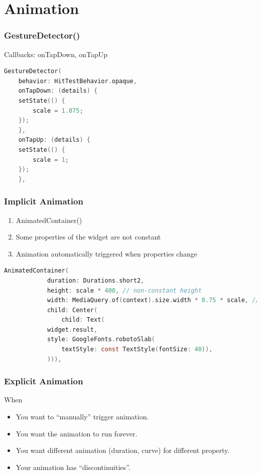 \documentclass[compress, aspectratio=32]{beamer}
\begin{document}
\section{Animation}
\begin{frame}[fragile]
    \frametitle{GestureDetector()}
    Callbacks: onTapDown, onTapUp
    \begin{lstlisting}[language=c, firstnumber=201]
GestureDetector(
    behavior: HitTestBehavior.opaque,
    onTapDown: (details) {
    setState(() {
        scale = 1.075;
    });
    },
    onTapUp: (details) {
    setState(() {
        scale = 1;
    });
    },
    \end{lstlisting}
\end{frame}
\begin{frame}[fragile]
    \frametitle{Implicit Animation}
    \begin{enumerate}
        \item AnimatedContainer()
        \item Some properties of the widget are not constant
        \item Animation automatically triggered when properties change
    \end{enumerate}
    \begin{lstlisting}[language=c, firstnumber=219]
AnimatedContainer(
            duration: Durations.short2,
            height: scale * 400, // non-constant height
            width: MediaQuery.of(context).size.width * 0.75 * scale, // non-constant width
            child: Center(
                child: Text(
            widget.result,
            style: GoogleFonts.robotoSlab(
                textStyle: const TextStyle(fontSize: 40)),
            ))),
    \end{lstlisting}
\end{frame}
\begin{frame}
    \frametitle{Explicit Animation}
    When
    \begin{itemize}
        \item You want to ``manually'' trigger animation.
        \item You want the animation to run forever.
        \item You want different animation (duration, curve) for different property.
        \item Your animation has ``discontinuities''.
    \end{itemize}
\end{frame}
\end{document}
